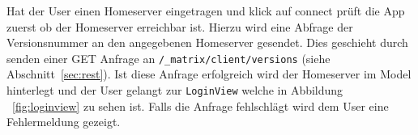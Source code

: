     Hat der User einen Homeserver eingetragen und klick auf connect prüft die App zuerst ob der Homeserver erreichbar ist.
    Hierzu wird eine Abfrage der Versionsnummer an den angegebenen Homeserver gesendet.
    Dies geschieht durch senden einer GET Anfrage an \texttt{/\_matrix/client/versions} (siehe Abschnitt~\ref{sec:rest}).
    Ist diese Anfrage erfolgreich wird der Homeserver im Model hinterlegt und der User gelangt zur \texttt{LoginView} welche in Abbildung ~\ref{fig:loginview} zu sehen ist.
    Falls die Anfrage fehlschlägt wird dem User eine Fehlermeldung gezeigt.
